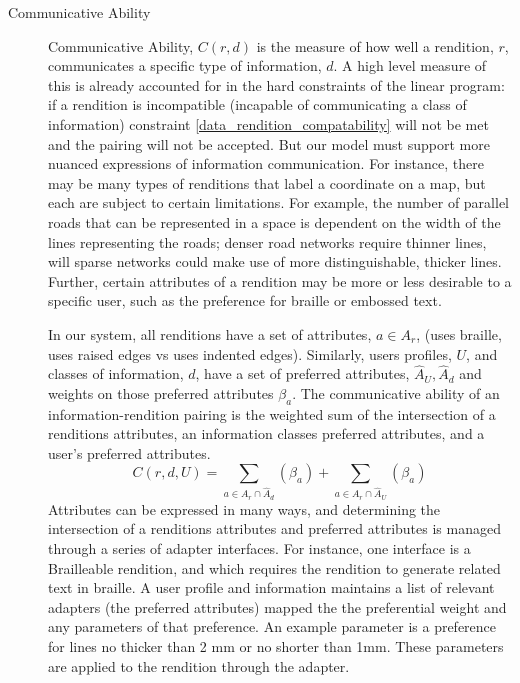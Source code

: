 \begin{description}
\item[Communicative Ability]
Communicative Ability, $C(r,d)$ is the measure of how well a rendition, $r$, communicates a specific type of information, $d$. A high level measure of this is already accounted for in the hard constraints of the linear program: if a rendition is incompatible (\ie incapable of communicating a class of information) constraint \ref{data_rendition_compatability} will not be met and the pairing will not be accepted. But our model must support more nuanced expressions of information communication. For instance, there may be many types of renditions that label a coordinate on a map, but each are subject to certain limitations. For example, the number of parallel roads that can be represented in a space is dependent on the width of the lines representing the roads; denser road networks require thinner lines, will sparse networks could make use of more distinguishable, thicker lines. Further, certain attributes of a rendition may be more or less desirable to a specific user, such as the preference for braille or embossed text. 

In our system, all renditions have a set of attributes, $a \in A_r$, (\eg uses braille, uses raised edges vs uses indented edges). Similarly, users profiles, $U$, and classes of information, $d$, have a set of preferred attributes, $\hat{A}_U,\hat{A}_d$ and weights on those preferred attributes $\beta_a$. The communicative ability of an information-rendition pairing is the weighted sum of the intersection of a renditions attributes, an information classes preferred attributes, and a user's preferred attributes. 
\begin{equation}
\label{eq::communicability}
C(r,d,U) = \sum_{a\in A_r \cap \hat{A}_d}(\beta_a) +  \sum _{a\in A_r \cap \hat{A}_U}(\beta_a)
\end{equation}
Attributes can be expressed in many ways, and determining the intersection of a renditions attributes and preferred attributes is managed through a series of adapter interfaces. For instance, one interface is a Brailleable rendition, and which requires the rendition to generate related text in braille. A user profile and information maintains a list of relevant adapters (\ie the preferred attributes) mapped the the preferential weight and any parameters of that preference. An example parameter is a preference for lines no thicker than 2 mm or no shorter than 1mm. These parameters are applied to the rendition through the adapter. 


\end{description}
